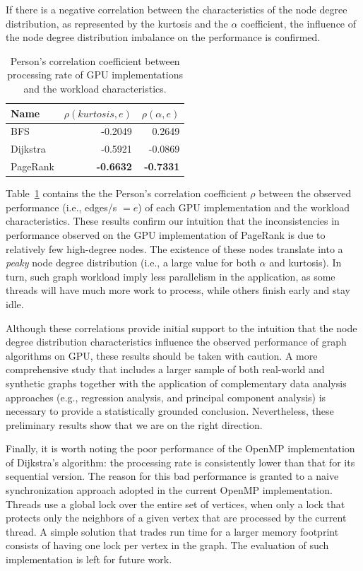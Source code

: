 If there is a negative correlation between the characteristics of the node degree distribution, as represented by the kurtosis and the $\alpha$ coefficient, the influence of the node degree distribution imbalance on the performance is confirmed. 

\begin{table}[ht]
\centering
\begin{tabular}{l|r|r}
Name     & $\rho(kurtosis,e)$ & $\rho(\alpha,e)$ \\\hline
BFS      & -0.2049       &  0.2649 \\\hline
Dijkstra & -0.5921       & -0.0869 \\\hline
PageRank & {\bf -0.6632} & {\bf -0.7331} \\\hline
\end{tabular}
\caption{Person's correlation coefficient between processing rate of GPU implementations and the workload characteristics.}
\label{tab:corr}
\end{table}

Table~\ref{tab:corr} contains the the Person's correlation coefficient $\rho$ between the observed performance (i.e., edges/s $= e$) of each GPU implementation and the workload characteristics. These results confirm our intuition that the inconsistencies in performance observed on the GPU implementation of PageRank is due to relatively few high-degree nodes. The existence of these nodes translate into a {\em peaky} node degree distribution (i.e., a large value for both $\alpha$ and kurtosis). In turn, such graph workload imply less parallelism in the application, as some threads will have much more work to process, while others finish early and stay idle. 

Although these correlations provide initial support to the intuition that the node degree distribution characteristics influence the observed performance of graph algorithms on GPU, these results should be taken with caution. A more comprehensive study that includes a larger sample of both real-world and synthetic graphs together with the application of complementary data analysis approaches (e.g., regression analysis, and principal component analysis) is necessary to provide a statistically grounded conclusion. Nevertheless, these preliminary results show that we are on the right direction.

Finally, it is worth noting the poor performance of the OpenMP implementation of Dijkstra's algorithm: the processing rate is consistently lower than that for its sequential version. The reason for this bad performance is granted to a naive synchronization approach adopted in the current OpenMP implementation. Threads use a global lock over the entire set of vertices, when only a lock that protects only the neighbors of a given vertex that are processed by the current thread. A simple solution that trades run time for a larger memory footprint consists of having one lock per vertex in the graph. The evaluation of such implementation is left for future work.
